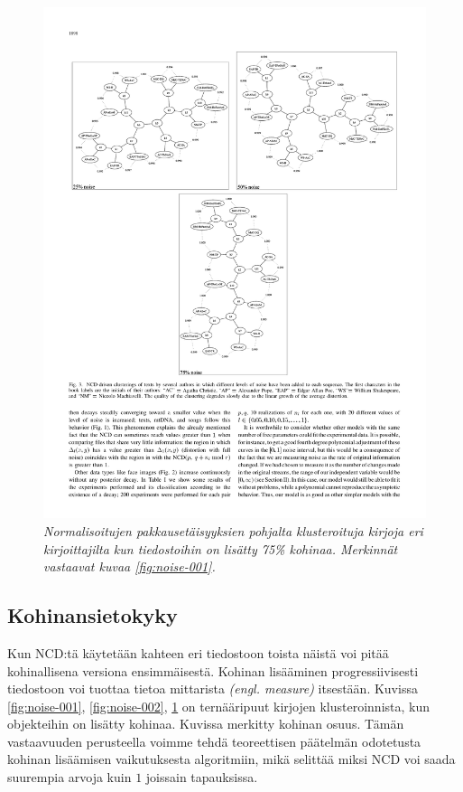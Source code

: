 \documentclass[12pt,finnish]{tktltiki2}
\theoremstyle{definition}
\theoremstyle{remark}
\newcommand{\engl}[1]{\emph{(engl. #1)}}
\begin{document}
    \begin{figure}[tb]
      \immediate{}
      \includegraphics{img/noise-003}
      \caption{\emph{Normalisoitujen pakkausetäisyyksien pohjalta klusteroituja kirjoja eri kirjoittajilta kun tiedostoihin on lisätty 75\% kohinaa. Merkinnät vastaavat kuvaa \ref{fig:noise-001}.}
      \cite{4167725}}
      \label{fig:noise-003}
    \end{figure}
  \subsection{Kohinansietokyky} %
  \label{sub:kohinansietokyky}

    Kun NCD:tä käytetään kahteen eri tiedostoon toista näistä voi pitää kohinallisena versiona ensimmäisestä.
    Kohinan lisääminen progressiivisesti tiedostoon voi tuottaa tietoa mittarista \engl{measure} itsestään.
    Kuvissa \ref{fig:noise-001}, \ref{fig:noise-002}, \ref{fig:noise-003} on ternääripuut kirjojen klusteroinnista, kun objekteihin on lisätty kohinaa. Kuvissa merkitty kohinan osuus.
    Tämän vastaavuuden perusteella voimme tehdä teoreettisen päätelmän odotetusta kohinan lisäämisen vaikutuksesta algoritmiin, mikä selittää miksi NCD voi saada suurempia arvoja kuin $1$ joissain tapauksissa. \cite{4167725}
\end{document}
